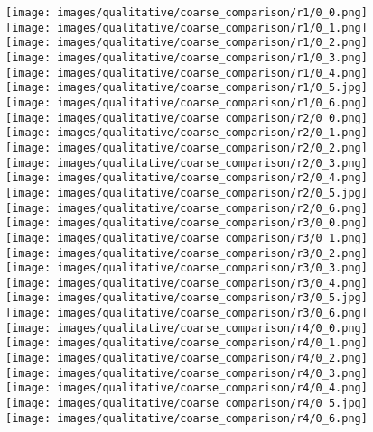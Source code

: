 \documentclass[final]{cvpr}
\begin{document}
\begin{figure}[t]
    \offinterlineskip
    \centering
    \texttt{[image: images/qualitative/coarse\_comparison/r1/0\_0.png]}\texttt{[image: images/qualitative/coarse\_comparison/r1/0\_1.png]}\texttt{[image: images/qualitative/coarse\_comparison/r1/0\_2.png]}\texttt{[image: images/qualitative/coarse\_comparison/r1/0\_3.png]}\texttt{[image: images/qualitative/coarse\_comparison/r1/0\_4.png]}\texttt{[image: images/qualitative/coarse\_comparison/r1/0\_5.jpg]}\texttt{[image: images/qualitative/coarse\_comparison/r1/0\_6.png]}\\  
    \texttt{[image: images/qualitative/coarse\_comparison/r2/0\_0.png]}\texttt{[image: images/qualitative/coarse\_comparison/r2/0\_1.png]}\texttt{[image: images/qualitative/coarse\_comparison/r2/0\_2.png]}\texttt{[image: images/qualitative/coarse\_comparison/r2/0\_3.png]}\texttt{[image: images/qualitative/coarse\_comparison/r2/0\_4.png]}\texttt{[image: images/qualitative/coarse\_comparison/r2/0\_5.jpg]}\texttt{[image: images/qualitative/coarse\_comparison/r2/0\_6.png]}\\  
    \texttt{[image: images/qualitative/coarse\_comparison/r3/0\_0.png]}\texttt{[image: images/qualitative/coarse\_comparison/r3/0\_1.png]}\texttt{[image: images/qualitative/coarse\_comparison/r3/0\_2.png]}\texttt{[image: images/qualitative/coarse\_comparison/r3/0\_3.png]}\texttt{[image: images/qualitative/coarse\_comparison/r3/0\_4.png]}\texttt{[image: images/qualitative/coarse\_comparison/r3/0\_5.jpg]}\texttt{[image: images/qualitative/coarse\_comparison/r3/0\_6.png]}\\  
    \texttt{[image: images/qualitative/coarse\_comparison/r4/0\_0.png]}\texttt{[image: images/qualitative/coarse\_comparison/r4/0\_1.png]}\texttt{[image: images/qualitative/coarse\_comparison/r4/0\_2.png]}\texttt{[image: images/qualitative/coarse\_comparison/r4/0\_3.png]}\texttt{[image: images/qualitative/coarse\_comparison/r4/0\_4.png]}\texttt{[image: images/qualitative/coarse\_comparison/r4/0\_5.jpg]}\texttt{[image: images/qualitative/coarse\_comparison/r4/0\_6.png]}\\  

\end{figure}
\end{document}
